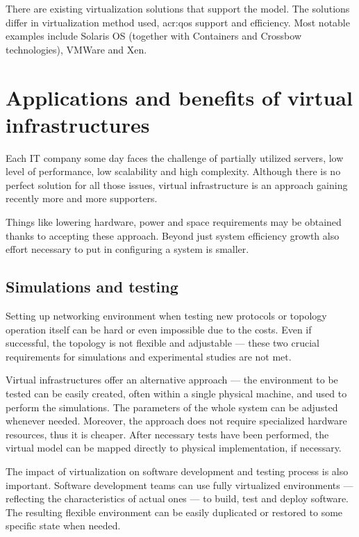 \documentclass[11pt,openany]{book}
\begin{document}
        There are existing virtualization solutions that support the model. The solutions differ in virtualization
        method used, \gls{acr:qos} support and efficiency. Most notable examples include Solaris OS (together with
        Containers and Crossbow technologies), VMWare and Xen.


    \section{Applications and benefits of virtual infrastructures}
    \label{sec:ctx:infra}

      Each IT company some day faces the challenge of partially utilized servers, low level of performance, low
      scalability and high complexity. Although there is no perfect solution for all those issues, virtual
      infrastructure is an approach gaining recently more and more supporters.  

      Things like lowering hardware, power and space requirements may be obtained thanks to accepting these approach.
      Beyond just system efficiency growth also effort necessary to put in configuring a system is smaller. 


      \subsection{Simulations and testing}

        Setting up networking environment when testing new protocols or topology operation itself can be hard or even
        impossible due to the costs. Even if successful, the topology is not flexible and adjustable --- these two
        crucial requirements for simulations and experimental studies are not met.

        Virtual infrastructures offer an alternative approach --- the environment to be tested can be easily created,
        often within a single physical machine, and used to perform the simulations. The parameters of the whole system
        can be adjusted whenever needed. Moreover, the approach does not require specialized hardware resources, thus it
        is cheaper. After necessary tests have been performed, the virtual model can be mapped directly to physical
        implementation, if necessary.

        The impact of virtualization on software development and testing process is also important. Software development
        teams can use fully virtualized environments --- reflecting the characteristics of actual ones --- to build,
        test and deploy software. The resulting flexible environment can be easily duplicated or restored to some
        specific state when needed.
\end{document}

